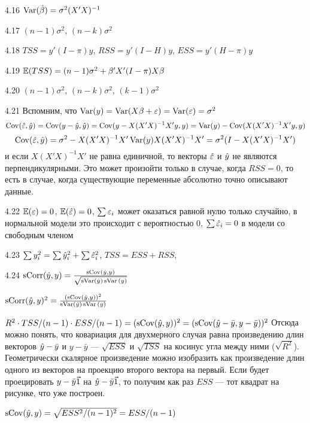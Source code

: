 \protect \hypertarget {soln:4.16}{}
\begin{solution}{{4.16}}
$\operatorname{Var}(\hat{\beta})=\sigma^2 (X'X)^{-1}$
\end{solution}
\protect \hypertarget {soln:4.17}{}
\begin{solution}{{4.17}}
$(n-1)\sigma^2$, $(n-k)\sigma^2$
\end{solution}
\protect \hypertarget {soln:4.18}{}
\begin{solution}{{4.18}}
$TSS=y'(I-\pi)y$, $RSS=y'(I-H)y$, $ESS=y'(H-\pi)y$
\end{solution}
\protect \hypertarget {soln:4.19}{}
\begin{solution}{{4.19}}
$\mathbb{E}(TSS)=(n-1)\sigma^2+\beta'X'(I-\pi)X\beta$
\end{solution}
\protect \hypertarget {soln:4.20}{}
\begin{solution}{{4.20}}
$(n-1)\sigma^2$, $(n-k)\sigma^2$, $(k-1)\sigma^2$
\end{solution}
\protect \hypertarget {soln:4.21}{}
\begin{solution}{{4.21}}
Вспомним, что $\operatorname{Var}(y)=\operatorname{Var}(X\beta+\varepsilon)=\operatorname{Var}(\varepsilon)=\sigma^2$
\[
\operatorname{Cov}(\hat{\varepsilon},\hat{y})=\operatorname{Cov}(y-\hat{y},\hat{y})=\operatorname{Cov}(y-X(X'X)^{-1}X'y,y)=\operatorname{Var}(y)-\operatorname{Cov}(X(X'X)^{-1}X'y,y)
\]
\[
\operatorname{Cov}(\hat{\varepsilon},\hat{y})=\sigma^2-X(X'X)^{-1}X'\operatorname{Var}(y)X(X'X)^{-1}X'=\sigma^2(I-X(X'X)^{-1}X')
\]
и если $X(X'X)^{-1}X'$ не равна единичной, то векторы $\hat{\varepsilon}$ и $\hat{y}$ не являются перпендикулярными. Это может произойти только в случае, когда $RSS=0$, то есть в случае, когда существующие переменные абсолютно точно описывают данные.
\end{solution}
\protect \hypertarget {soln:4.22}{}
\begin{solution}{{4.22}}
$\mathbb{E}(\varepsilon)=0$, $\mathbb{E}(\hat{\varepsilon})=0$, $\sum \varepsilon_i$ может оказаться равной нулю только случайно, в нормальной модели это происходит с вероятностью 0, $\sum \hat{\varepsilon}_i=0$ в модели со свободным членом
\end{solution}
\protect \hypertarget {soln:4.23}{}
\begin{solution}{{4.23}}
$\sum y_i^2=\sum \hat{y}_i^2+\sum \hat{\varepsilon}_i^2$, $TSS=ESS+RSS$,
\end{solution}
\protect \hypertarget {soln:4.24}{}
\begin{solution}{{4.24}}
$\operatorname{sCorr}(\hat{y}, y)=\frac{\operatorname{sCov}(\hat{y}, y)}{\sqrt{\operatorname{sVar}(\hat{y})\operatorname{sVar}{(y)}}}$

$\operatorname{sCorr}(\hat{y}, y)^2=\frac{(\operatorname{sCov}(\hat{y}, y))^2}{\operatorname{sVar}(\hat{y})\operatorname{sVar}{(y)}} $

$R^2\cdot TSS/(n-1)\cdot ESS/(n-1)=(\operatorname{sCov}(\hat{y}, y))^2=(\operatorname{sCov}(\hat{y}-\bar y, y-\bar y))^2$
Отсюда можно понять, что ковариация для двухмерного случая равна произведению длин векторов $\hat{y}-\bar y$ и $y-\bar y$ — $\sqrt{ESS}$ и $\sqrt{TSS}$ на косинус угла между ними ($\sqrt{R^2}$). Геометрически скалярное произведение можно изобразить как произведение длин одного из векторов на проекцию второго вектора на первый. Если будет проецировать $y-\bar y\v1$ на $\hy-\bar y\v1$, то получим как раз $ESS$ — тот квадрат на рисунке, что уже построен.


$\operatorname{sCov}(\hat{y}, y)=\sqrt{ESS^2/(n-1)^2}=ESS/(n-1)$


\end{solution}
